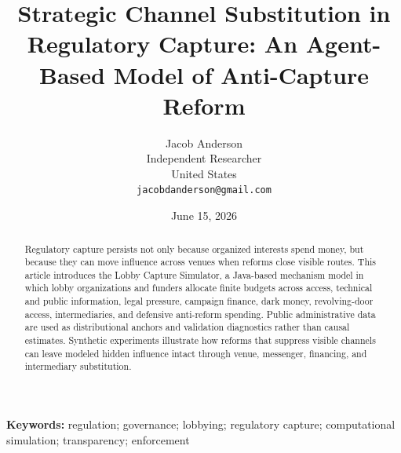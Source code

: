 \documentclass[11pt]{article}
\title{Strategic Channel Substitution in Regulatory Capture: An Agent-Based Model of Anti-Capture Reform}
\author{Jacob Anderson\\Independent Researcher\\United States\\\texttt{jacobdanderson@gmail.com}}
\date{June 15, 2026}
\begin{document}
\maketitle

\begin{abstract}
Regulatory capture persists not only because organized interests spend money, but because they can move influence across venues when reforms close visible routes. This article introduces the Lobby Capture Simulator, a Java-based mechanism model in which lobby organizations and funders allocate finite budgets across access, technical and public information, legal pressure, campaign finance, dark money, revolving-door access, intermediaries, and defensive anti-reform spending. Public administrative data are used as distributional anchors and validation diagnostics rather than causal estimates. Synthetic experiments illustrate how reforms that suppress visible channels can leave modeled hidden influence intact through venue, messenger, financing, and intermediary substitution.
\end{abstract}

\noindent\textbf{Keywords:} regulation; governance; lobbying; regulatory capture; computational simulation; transparency; enforcement

\bigskip





\begingroup
\raggedright
\footnotesize
\setlength{\bibsep}{0pt}


\endgroup
\end{document}
